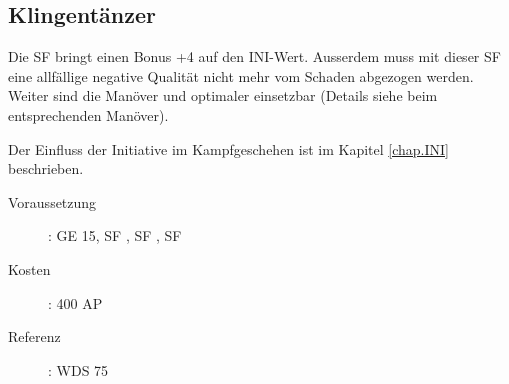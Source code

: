 \subsection{Klingentänzer}
\label{sf.klingentaenzer}
Die SF  bringt einen Bonus +4 auf den INI-Wert.
Ausserdem muss mit dieser SF eine allfällige negative Qualität nicht mehr vom Schaden abgezogen werden.
Weiter sind die Manöver  und  optimaler einsetzbar (Details siehe beim entsprechenden Manöver).

Der Einfluss der Initiative im Kampfgeschehen ist im Kapitel \ref{chap.INI} beschrieben.
\begin{description}
    \item[Voraussetzung]:
        GE 15, SF , SF , SF 
    \item [Kosten]:
        400 AP
    \item [Referenz]:
        WDS 75
\end{description}

